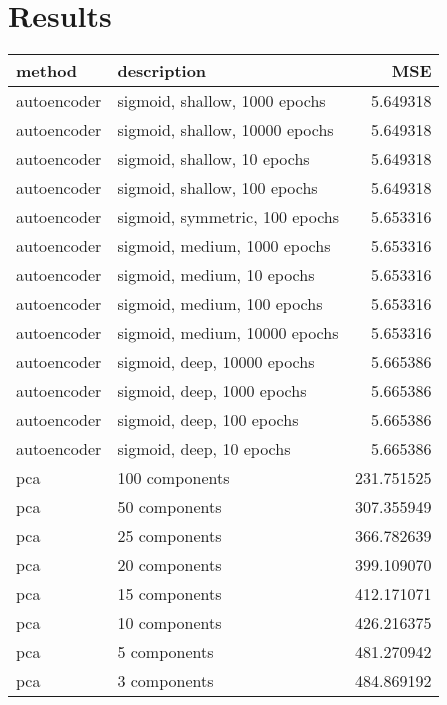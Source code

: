 \documentclass{article}
\begin{document}
\section{Results}
\begin{table}
    \centering
\begin{tabular}{llr}
\toprule
     method &                     description &          MSE \\
\midrule
autoencoder &   sigmoid, shallow, 1000 epochs &     5.649318 \\
autoencoder &  sigmoid, shallow, 10000 epochs &     5.649318 \\
autoencoder &     sigmoid, shallow, 10 epochs &     5.649318 \\
autoencoder &    sigmoid, shallow, 100 epochs &     5.649318 \\
autoencoder &  sigmoid, symmetric, 100 epochs &     5.653316 \\
autoencoder &    sigmoid, medium, 1000 epochs &     5.653316 \\
autoencoder &      sigmoid, medium, 10 epochs &     5.653316 \\
autoencoder &     sigmoid, medium, 100 epochs &     5.653316 \\
autoencoder &   sigmoid, medium, 10000 epochs &     5.653316 \\
autoencoder &     sigmoid, deep, 10000 epochs &     5.665386 \\
autoencoder &      sigmoid, deep, 1000 epochs &     5.665386 \\
autoencoder &       sigmoid, deep, 100 epochs &     5.665386 \\
autoencoder &        sigmoid, deep, 10 epochs &     5.665386 \\
        pca &                  100 components &   231.751525 \\
        pca &                   50 components &   307.355949 \\
        pca &                   25 components &   366.782639 \\
        pca &                   20 components &   399.109070 \\
        pca &                   15 components &   412.171071 \\
        pca &                   10 components &   426.216375 \\
        pca &                    5 components &   481.270942 \\
        pca &                    3 components &   484.869192 \\

\end{tabular}
\end{table}
\end{document}
